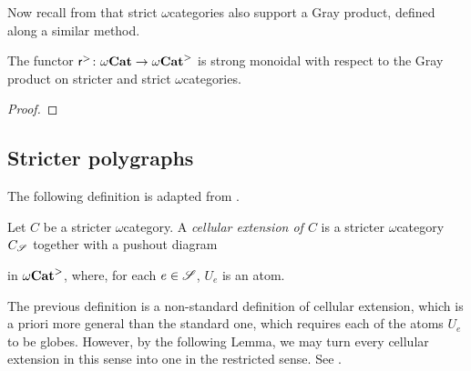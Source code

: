 
Now recall from \cite[Appendice A]{ara2020joint} that strict \( \omega \)\nbd categories also support a Gray product, defined along a similar method.

\begin{prop} \label{prop:reflection_to_stricter_monoidal}
    The functor \( \mathsf{r}^{>} \colon {\omega\mathbf{Cat}} \to {\omega\mathbf{Cat}}^> \) is strong monoidal with respect to the Gray product on stricter and strict \( \omega \)\nbd categories.
\end{prop}
\begin{proof}
\end{proof}


\subsection{Stricter polygraphs}

\noindent The following definition is adapted from \cite[8.2.1]{hadzihasanovic2024combinatorics}.
\begin{dfn}  \label{dfn:cellular_extension}
    Let \( C \) be a stricter \( \omega \)\nbd category.
    A \emph{cellular extension of \( C \)} is a stricter \( \omega \)\nbd category \( C_{\mathscr{S}} \) together with a pushout diagram 
    \begin{center}
    \end{center}
    in \( {\omega\mathbf{Cat}}^> \), where, for each \( e \in \mathscr{S} \), \( U_e \) is an atom.
\end{dfn}

\begin{comm}
    The previous definition is a non-standard definition of cellular extension, which is a priori more general than the standard one, which requires each of the atoms \( U_e \) to be globes.
    However, by the following Lemma, we may turn every cellular extension in this sense into one in the restricted sense. 
    See \cite[Comment 8.2.2]{hadzihasanovic2024combinatorics}. 
\end{comm}

